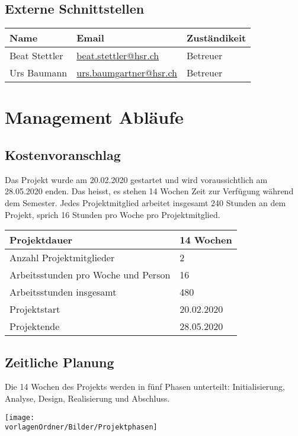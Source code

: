 \documentclass[
	ngerman,
	toc=listof, %
	toc=bibliography, %
	footnotes=multiple, %
	parskip=half, %
	numbers=noendperiod %
]{scrartcl}
\newcommand{\vorlagenOrdner}{../../99_Vorlagen} %
\begin{document}
	\subsection{Externe Schnittstellen}
		\begin{tabularx}{0.9\textwidth}{lXl}
			\toprule
			Name & Email & Zuständikeit \\
			\midrule
			Beat Stettler & \url{beat.stettler@hsr.ch} & Betreuer \\
			Urs Baumann & \url{urs.baumgartner@hsr.ch} & Betreuer \\
			\bottomrule
		\end{tabularx}

\section{Management Abläufe}

	\subsection{Kostenvoranschlag}
		Das Projekt wurde am 20.02.2020 gestartet und wird voraussichtlich am 28.05.2020 enden.
		Das heisst, es stehen 14 Wochen Zeit zur Verfügung während dem Semester. 
		Jedes Projektmitglied arbeitet insgesamt 240 Stunden an dem Projekt, sprich 16 Stunden pro Woche pro Projektmitglied. 
		\begin{tabularx}{\textwidth}{Xl}
			\midrule
			Projektdauer & 14 Wochen \\
			\midrule
			Anzahl Projektmitglieder & 2 \\
			\midrule
			Arbeitsstunden pro Woche und Person & 16 \\
			\midrule
			Arbeitsstunden insgesamt & 480 \\
			\midrule
			Projektstart & 20.02.2020 \\
			\midrule
			Projektende & 28.05.2020 \\
			\midrule
		\end{tabularx}

	\subsection{Zeitliche Planung}
		Die 14 Wochen des Projekts werden in fünf Phasen unterteilt: Initialisierung, Analyse, Design, Realisierung und Abschluss.
		\begin{center}
			\label{ZeitplanOverview}
			\texttt{[image: \\vorlagenOrdner/Bilder/Projektphasen]}
		\end{center}
\end{document}
